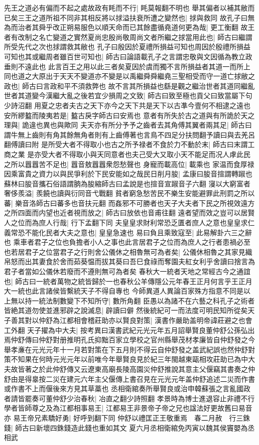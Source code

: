 先王之道必有偏而不起之處故政有眊而不行|{
	眊莫報翻不明也}
舉其偏者以補其敝而已矣三王之道所祖不同非其相反將以捄溢扶衰所遭之變然也|{
	捄與救同}
故孔子曰無為而治者其舜乎改正朔易服色以順天命而已其餘盡循堯道何更為哉|{
	更工衡翻}
故王者有改制之名亡變道之實然夏尚忠殷尚敬周尚文者所繼之捄當用此也|{
	師古曰繼謂所受先代之次也捄謂救其敝也}
孔子曰殷因於夏禮所損益可知也周因於殷禮所損益可知也其或繼周者雖百世可知也|{
	師古曰論語載孔子之言謂忠敬與文因循為教立政垂則不遠此也}
此言百王之用以此三者矣夏因於虞而獨不言所損益者其道一而所上同也道之大原出于天天不變道亦不變是以禹繼舜舜繼堯三聖相受而守一道亡捄敝之政也|{
	師古曰言政和平不須救弊也}
故不言其所損益也繇是觀之繼治世者其道同繼亂世者其道變今漢繼大亂之後若宜少損周之文致|{
	師古曰致至極也貢父曰致當屬下句少詩沼翻}
用夏之忠者夫古之天下亦今之天下共是天下以古凖今壹何不相逮之遠也安所繆盭而陵夷若是|{
	盭古戾字師古曰安焉也}
意者有所失於古之道與有所詭於天之理與|{
	詭違也異也與歟同}
夫天亦有所分予予之齒者去其角傅其翼者兩其足|{
	師古曰謂牛無上齒則有角其餘無角者則有上齒傅著也言鳥不四足分扶問翻予讀曰與去羌呂翻傅讀曰附}
是所受大者不得取小也古之所予禄者不食於力不動於末|{
	師古曰末謂工商之業}
是亦受大者不得取小與天同意者也夫己受大又取小天不能足而况人虖此民之所以囂囂苦不足也|{
	囂音敖囂囂衆怨愁聲也}
身寵而載高位|{
	載乘也}
家温而食厚禄因乘富貴之資力以與民爭利於下民安能如之哉民日削月朘|{
	孟康曰朘音揎謂轉踧也蘇林曰朘音攜石俗語謂朒為朘縮師古曰孟說是也揎音宣踧音子六翻}
寖以大窮富者奢侈羨溢|{
	羨饒也讀與衍同音弋戰翻}
貧者窮急愁苦民不樂生安能避罪此刑罰之所以蕃|{
	樂音洛師古曰蕃多也音扶元翻}
而姦邪不可勝者也天子大夫者下民之所視效遠方之所四面而内望也近者視而放之|{
	師古曰放依也音甫往翻}
遠者望而效之豈可以居賢人之位而為庶人行哉|{
	行下孟翻下同}
夫皇皇求財利常恐乏匱者庶人之意也皇皇求仁義常恐不能化民者大夫之意也|{
	皇皇急速也}
易曰負且乘致寇至|{
	此易解卦六三之辭也}
乘車者君子之位也負擔者小人之事也此言居君子之位而為庶人之行者患禍必至也若居君子之位當君子之行則舍公儀休之相魯無可為者矣|{
	公儀休相魯之其家見織帛怒而出其妻食於舍而茹葵愠而拔其葵曰吾巳食祿而奪園夫紅女利乎舍讀曰捨言為君子者當如公儀休若廢而不遵則無可為者矣}
春秋大一統者天地之常經古今之通誼也|{
	師古曰一統者萬物之統皆歸於一也春秋公羊傳隱公元年春王正月何言乎王正月大一統也此言諸侯皆繫統天子不得自專也}
今師異道人異論百家殊方指意不同是以上無以持一統法制數變下不知所守|{
	數所角翻}
臣愚以為諸不在六藝之科孔子之術者皆絶其道勿使並進邪辟之說滅息|{
	辟讀曰僻}
然後統紀可一而法度可明民知所從矣天子善其對以仲舒為江都相會稽莊助亦以賢良對策|{
	漢書作嚴助盖明帝諱莊避之也會工外翻}
天子擢為中大夫|{
	按考異曰漢書武紀元光元年五月詔舉賢良董仲舒公孫弘出焉仲舒傳曰仲舒對册推明孔氏抑黜百家立學校之官州縣舉茂材孝廉皆自仲舒發之今舉孝亷在元光元年十一月若對策在下五月則不得云自仲舒發之盖武紀誤也然仲舒對策不知果在何時元光元年以前唯今年舉賢良見於紀三年閩越東甌相攻莊助已為中大夫故皆著之於此仲舒傳又云遼東高廟長陵高園災仲舒推說其意主父偃竊其書奏之仲舒由是得辠按二災在建元六年主父偃傳上書召見在元光元年盖仲舒追述二災而作書或作書不上而偃後來方見其草藁也}
丞相衛綰奏所舉賢良或治申韓蘇張之言亂國政者請皆罷奏可董仲舒少治春秋|{
	冶直之翻少詩照翻}
孝景時為博士進退容止非禮不行學者皆師尊之及為江都相事易王|{
	江都易王非景帝子帝之兄也諡法好更故舊曰易音亦}
易王帝兄素驕好勇|{
	好呼到翻下同}
仲舒以禮匡正王敬重焉　春二月赦　行三銖錢|{
	師古曰新壞四銖錢造此錢也重如其文}
夏六月丞相衛綰免丙寅以魏其侯竇嬰為丞相武

